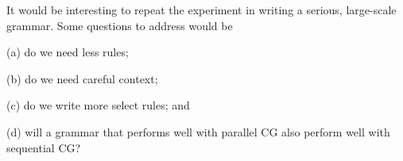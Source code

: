It would be interesting to repeat the experiment in writing a serious, large-scale grammar.
Some questions to address would be 
\begin{inparaenum}
\item[(a)] do we need less rules;
\item[(b)] do we need careful context;
\item[(c)] do we write more {\sc select} rules; and
\item[(d)] will a grammar that performs well with parallel CG also perform well with sequential CG?
\end{inparaenum}











